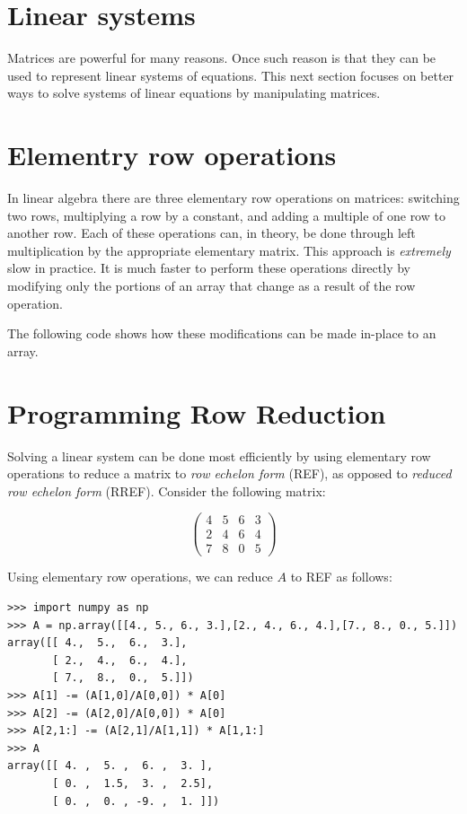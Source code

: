 \section*{Linear systems}
Matrices are powerful for many reasons. Once such reason is that they can be used to represent linear systems of equations. This next section focuses on better ways to solve systems of linear equations by manipulating matrices.

\section*{Elementry row operations}
In linear algebra there are three elementary row operations on matrices: switching two rows, multiplying a row by a constant, and adding a multiple of one row to another row. Each of these operations can, in theory, be done through left multiplication by the appropriate elementary matrix. This approach is \emph{extremely} slow in practice.
It is much faster to perform these operations directly by modifying only the portions of an array that change as a result of the row operation.


The following code shows how these modifications can be made in-place to an array.



\section*{Programming Row Reduction}
Solving a linear system can be done most efficiently by using elementary row operations to reduce a matrix to \emph{row echelon form} (REF), as opposed to \emph{reduced row echelon form} (RREF).
Consider the following matrix:

\[
\begin{pmatrix}
4&5&6&3 \\
2&4&6&4 \\
7&8&0&5
\end{pmatrix}
\]

Using elementary row operations, we can reduce $A$ to REF as follows:

\begin{lstlisting}
>>> import numpy as np
>>> A = np.array([[4., 5., 6., 3.],[2., 4., 6., 4.],[7., 8., 0., 5.]])
array([[ 4.,  5.,  6.,  3.],
       [ 2.,  4.,  6.,  4.],
       [ 7.,  8.,  0.,  5.]])
>>> A[1] -= (A[1,0]/A[0,0]) * A[0]
>>> A[2] -= (A[2,0]/A[0,0]) * A[0]
>>> A[2,1:] -= (A[2,1]/A[1,1]) * A[1,1:]
>>> A
array([[ 4. ,  5. ,  6. ,  3. ],
       [ 0. ,  1.5,  3. ,  2.5],
       [ 0. ,  0. , -9. ,  1. ]])
\end{lstlisting}

